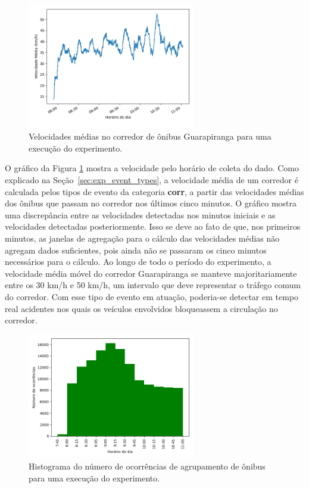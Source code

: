 \begin{figure}[h!]
 \centering
 \includegraphics[width=0.65\textwidth]{figuras/detect_graphics/avg_speed_7-dez-su-corr_Guarapiranga.png}
 \caption{Velocidades médias no corredor de ônibus Guarapiranga para uma execução do experimento.}
 \label{fig:avg_speed_guara_1}
\end{figure}


\newpage

O gráfico da Figura \ref{fig:avg_speed_guara_1} mostra a velocidade pelo horário de coleta do dado. 
Como explicado na Seção~\ref{sec:exp_event_types}, a velocidade média de um corredor é calculada pelos tipos de evento da categoria \textbf{corr}, a partir das velocidades médias dos ônibus que passam no corredor nos últimos cinco minutos.
O gráfico mostra uma discrepância entre as velocidades detectadas nos minutos iniciais e as velocidades detectadas posteriormente. Isso se deve ao fato de que, nos primeiros minutos, as janelas de agregação para o cálculo das velocidades médias não agregam dados suficientes,  pois ainda não se passaram os cinco minutos necessários para o cálculo. Ao longo de todo o período do experimento, a velocidade média móvel do corredor Guarapiranga se manteve majoritariamente entre os 30 km/h e 50 km/h, um intervalo que deve representar o tráfego comum do corredor. Com esse tipo de evento em atuação, poderia-se detectar em tempo real acidentes nos quais os veículos envolvidos bloqueassem a circulação no corredor.

\begin{figure}[hb]
\centering
  \includegraphics[width=0.65\textwidth]{figuras/detect_graphics/histogram_7-dez-su_BB.png}
  \caption{Histograma do número de ocorrências de agrupamento de ônibus para uma execução do experimento.}
  \label{fig:histogram_Bus_Bunching}
\end{figure}


